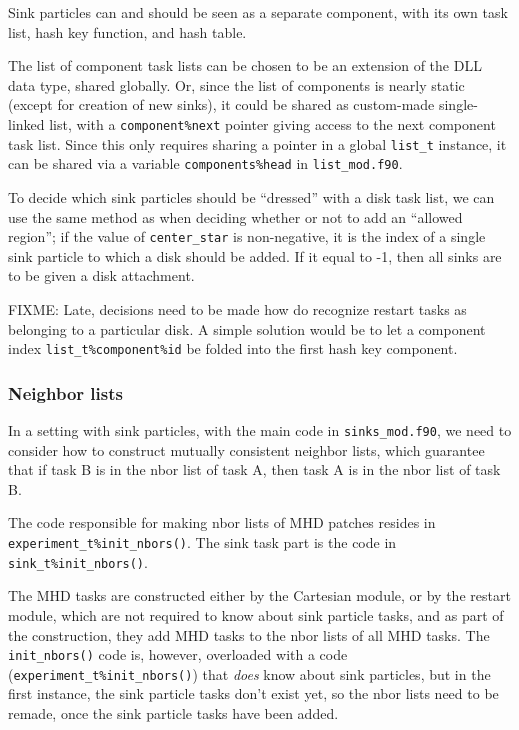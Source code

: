 \documentclass[paper=a4,fontsize=11pt]{scrartcl}
\numberwithin{equation}{section}		%
\numberwithin{figure}{section}			%
\numberwithin{table}{section}				%
\newcommand{\codecolor}{\color{Blue}}
\newcommand{\filecolor}{\color{NavyBlue}}
\newcommand{\File}[1]{{\filecolor\texttt{#1}}}
\newcommand{\Code}[1]{{\codecolor\texttt{#1}}}
\begin{document}
Sink particles can and should be seen as a separate component, with its own task list, hash key function, and hash table.

The list of component task lists can be chosen to be an extension of the DLL data type, shared globally.  Or, since the list of components is nearly static (except for creation of new sinks), it could be shared as custom-made single-linked list, with a \verb:component%next: pointer giving access to the next component task list.  Since this only requires sharing a pointer in a global \verb:list_t: instance, it can be shared via a variable \verb:components%head: in \File{list\_mod.f90}.

To decide which sink particles should be ``dressed'' with a disk task list, we can use the same method as when deciding whether or not to add an ``allowed region''; if the value of  \verb:center_star: is non-negative, it is the index of a single sink particle to which a disk should be added.  If it equal to -1, then all sinks are to be given a disk attachment.

FIXME: Late, decisions need to be made how do recognize restart tasks as belonging to a particular disk.  A simple solution would be to let a component index \verb:list_t%component%id: be folded into the first hash key component.

\subsubsection{Neighbor lists}
In a setting with sink particles, with the main code in \File{sinks\_mod.f90}, we need to consider how to construct mutually consistent neighbor lists, which guarantee that if task B is in the nbor list of task A, then task A is in the nbor list of task B.

The code responsible for making nbor lists of MHD patches resides in \Code{experiment\_t\%init\_nbors()}.  The sink task part is the code in \Code{sink\_t\%init\_nbors()}.

The MHD tasks are constructed either by the Cartesian module, or by the restart module, which are not required to know about sink particle tasks, and as part of the construction, they add MHD tasks to the nbor lists of all MHD tasks.   The \verb:init_nbors(): code is, however, overloaded with a code (\verb:experiment_t%init_nbors():) that \textit{does} know about sink particles, but in the first instance, the sink particle tasks don't exist yet, so the nbor lists need to be remade, once the sink particle tasks have been added.
\end{document}
